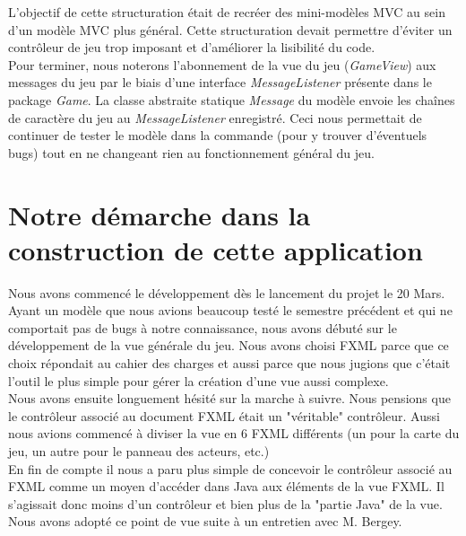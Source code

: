 \documentclass[./standalone.tex]{subfiles}
\begin{document}
L'objectif de cette structuration était de recréer des mini-modèles MVC au sein d'un modèle MVC plus général. Cette structuration devait permettre d'éviter un contrôleur de jeu trop imposant et d'améliorer la lisibilité du code.\\

Pour terminer, nous noterons l'abonnement de la vue du jeu (\textit{GameView}) aux messages du jeu par le biais d'une interface \textit{MessageListener} présente dans le package \textit{Game}. La classe abstraite statique \textit{Message} du modèle envoie les chaînes de caractère du jeu au \textit{MessageListener} enregistré. Ceci nous permettait de continuer de tester le modèle dans la commande (pour y trouver d'éventuels bugs) tout en ne changeant rien au fonctionnement général du jeu.
\newpage


\section{Notre démarche dans la construction de cette application}
\medskip

Nous avons commencé le développement dès le lancement du projet le 20 Mars. Ayant un modèle que nous avions beaucoup testé le semestre précédent et qui ne comportait pas de bugs à notre connaissance, nous avons débuté sur le développement de la vue générale du jeu. Nous avons choisi FXML parce que ce choix répondait au cahier des charges et aussi parce que nous jugions que c'était l'outil le plus simple pour gérer la création d'une vue aussi complexe.\\

Nous avons ensuite longuement hésité sur la marche à suivre. Nous pensions que le contrôleur associé au document FXML était un "véritable" contrôleur. Aussi nous avions commencé à diviser la vue en 6 FXML différents (un pour la carte du jeu, un autre pour le panneau des acteurs, etc.)\\

En fin de compte il nous a paru plus simple de concevoir le contrôleur associé au FXML comme un moyen d'accéder dans Java aux éléments de la vue FXML. Il s'agissait donc moins d'un contrôleur et bien plus de la "partie Java" de la vue. Nous avons adopté ce point de vue suite à un entretien avec M. Bergey.\\
\end{document}
